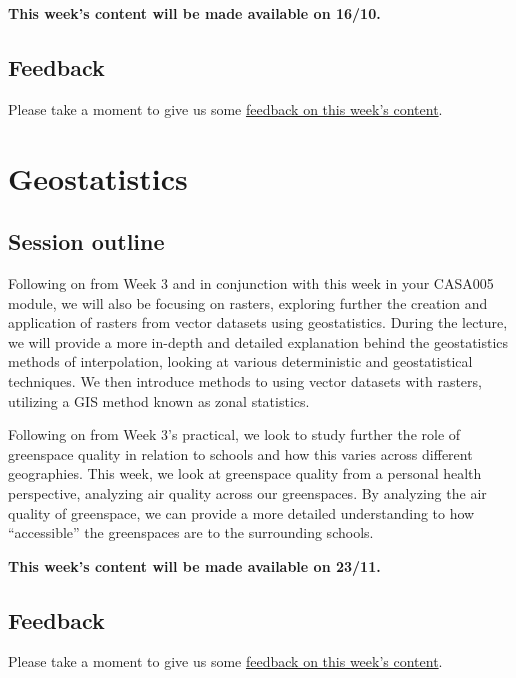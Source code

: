 \documentclass[
]{book}
\begin{document}
\textbf{This week's content will be made available on 16/10.}

\hypertarget{feedback}{%
\section{Feedback}\label{feedback}}

Please take a moment to give us some \href{https://forms.gle/BYbZySVSHeoUEkJh9}{feedback on this week's content}.

\hypertarget{geostatistics}{%
\chapter{Geostatistics}\label{geostatistics}}

\hypertarget{session-outline}{%
\section{Session outline}\label{session-outline}}

Following on from Week 3 and in conjunction with this week in your CASA005 module, we will also be focusing on rasters, exploring further the creation and application of rasters from vector datasets using geostatistics. During the lecture, we will provide a more in-depth and detailed explanation behind the geostatistics methods of interpolation, looking at various deterministic and geostatistical techniques. We then introduce methods to using vector datasets with rasters, utilizing a GIS method known as zonal statistics.

Following on from Week 3's practical, we look to study further the role of greenspace quality in relation to schools and how this varies across different geographies. This week, we look at greenspace quality from a personal health perspective, analyzing air quality across our greenspaces. By analyzing the air quality of greenspace, we can provide a more detailed understanding to how ``accessible'' the greenspaces are to the surrounding schools.

\textbf{This week's content will be made available on 23/11.}

\hypertarget{feedback}{%
\section{Feedback}\label{feedback}}

Please take a moment to give us some \href{https://forms.gle/BYbZySVSHeoUEkJh9}{feedback on this week's content}.
\end{document}
